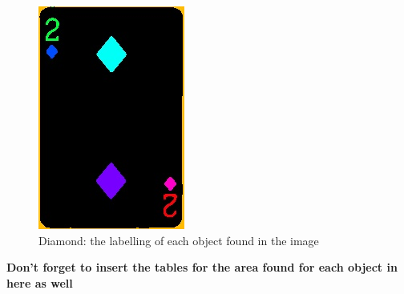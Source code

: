 \documentclass[conference]{IEEEtran}
\begin{document}
\begin{figure}[!htb]
\begin{minipage}[b]{0.2\textwidth}
    \includegraphics[width=\textwidth]{../programme/results/Task_3/diamond/image_1.jpg}
    \caption{Diamond: the labelling of each object found in the image}
    \label{Diamond: the labelling of each object found in the image}
  \end{minipage}
\end{figure}

\textbf{Don't forget to insert the tables for the area found for each object in here as well}
\end{document}
